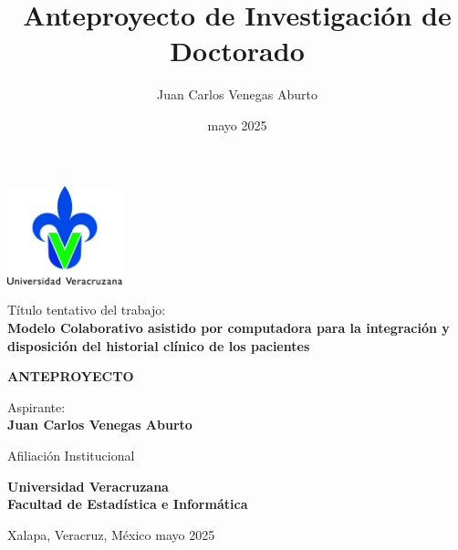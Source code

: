 \documentclass[12pt, letterpaper]{article}
\title{Anteproyecto de Investigación de Doctorado}
\author{Juan Carlos Venegas Aburto}
\date{mayo 2025}
\begin{document}
\begin{center}
    \thispagestyle{empty}
    \includegraphics [width=0.25\textwidth] {images/logoUV}

    \vspace{1.5cm}

    \LARGE{Título tentativo del trabajo:}\\
    \LARGE{\textbf{Modelo Colaborativo asistido por computadora para la integración y disposición del historial clínico de los pacientes}}

    \vspace{2cm}
    
    \LARGE{\textbf{ANTEPROYECTO}}
    
    \vspace{2cm}

    \Large{Aspirante:}\\
    \LARGE{\textbf{Juan Carlos Venegas Aburto}}

    \vspace{2cm}

    \Large{Afiliación Institucional}


    \LARGE{\textbf{Universidad Veracruzana}}\\
    \LARGE{\textbf{Facultad de Estadística e Informática}}
        
\end{center}

\vspace{4cm}

\Large Xalapa, Veracruz, México \hfill \Large mayo 2025

\newpage
\thispagestyle{empty}

\renewcommand{\contentsname}{Ìndice}
\tableofcontents

\newpage
\setcounter{page}{1}





\end{document}

